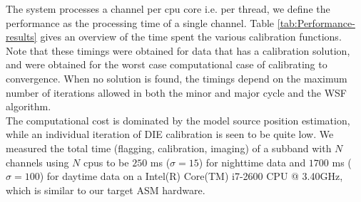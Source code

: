 \documentclass{aa}
\begin{document}
The  system processes a  channel per  cpu core  i.e. per  thread, we  define the
performance   as   the   processing   time   of   a   single   channel.    Table
\ref{tab:Performance-results} gives  an overview of  the time spent  the various
calibration functions. Note that these timings were obtained for data that has a
calibration solution, and were obtained for the worst case computational case of
calibrating to convergence. When no solution is found, the timings depend on the
maximum number of  iterations allowed in both the minor and  major cycle and the
WSF  algorithm. \\  The  computational cost  is  dominated by  the model  source
position estimation, while an individual iteration of DIE calibration is seen to
be quite low.  We measured the total time (flagging,  calibration, imaging) of a
subband with  $N$ channels using  $N$ cpus  to be $250$  ms ($\sigma =  15$) for
nighttime data  and $1700$ ms  ($\sigma = 100$)  for daytime data on  a Intel(R)
Core(TM) i7-2600 CPU @ 3.40GHz, which is similar to our target ASM hardware.
\begin{table}[tbh]

\caption{\label{tab:Performance-results}   Overview  of   the   time  spent   in
  calibration function  blocks for various datasets (daytime  and nighttime). We
  measured the  overall time  (flagging, calibrating, imaging)  of an ACM  to be
  $250$ ms ($\sigma = 15$) for nighttime data and $1700$ ms ($\sigma = 100$) for
  daytime   data  using   current  generation   hardware,  and   calibrating  to
  convergence. The day latency is seen to be much worse due to the presence of a
  very active Sun leading to significant modeling errors.}
\end{table}
\end{document}
